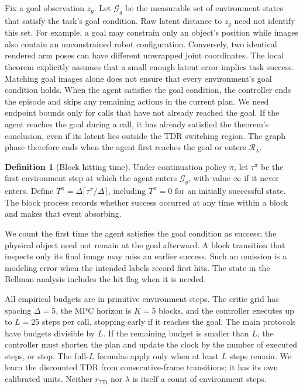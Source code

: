 \documentclass{article}
\newcommand{\Htd}{r_{\mathrm{TD}}}
\newcommand{\Rset}{\mathcal R_\lambda}
\theoremstyle{definition}
\newtheorem{definition}[theorem]{Definition}
\theoremstyle{remark}
\begin{document}
Fix a goal observation $z_g$. Let $\mathcal G_g$ be the measurable set of environment
states that satisfy the task's goal condition. Raw latent distance to $z_g$ need not identify this set.
For example, a goal may constrain only an object's position while images also contain
an unconstrained robot configuration. Conversely, two identical rendered arm poses can
have different unwrapped joint coordinates. The local theorem explicitly assumes that a
small enough latent error implies task success. Matching goal images alone does not
ensure that every environment's goal condition holds.
When the agent satisfies the goal condition, the controller ends the episode and skips
any remaining actions in the current plan.
We need endpoint bounds only for calls that have not already reached the goal.
If the agent reaches the goal during a call, it has already satisfied the theorem's
conclusion, even if its latent lies outside the TDR switching region.
The graph phase therefore ends when the agent first reaches the goal or enters $\Rset$.

\begin{definition}[Block hitting time]
Under continuation policy $\pi$, let $\tau^\pi$ be the first environment step at which
the agent enters $\mathcal G_g$, with value $\infty$ if it never enters. Define
$T^\pi=\Delta\lceil\tau^\pi/\Delta\rceil$, including $T^\pi=0$ for an initially
successful state. The block process records whether success occurred at any time within
a block and makes that event absorbing.
\end{definition}
We count the first time the agent satisfies the goal condition as success; the
physical object need not remain at the goal afterward.
A block transition that inspects only its final image may miss an earlier success.
Such an omission is a modeling error when the intended labels record first hits.
The state in the Bellman analysis includes the hit flag when it is needed.

All empirical budgets are in primitive environment steps. The critic grid has spacing
$\Delta=5$, the MPC horizon is $K=5$ blocks, and the controller executes up to $L=25$
steps per call, stopping early if it reaches the goal.
The main protocols have budgets divisible by $L$. If the remaining budget is smaller
than $L$, the controller must shorten the plan and update the clock by the number of
executed steps, or stop. The full-$L$ formulas apply only when at least $L$ steps remain.
We learn the discounted TDR from consecutive-frame transitions; it has its own
calibrated units. Neither $\Htd$ nor $\lambda$ is itself a count of environment steps.
\end{document}
